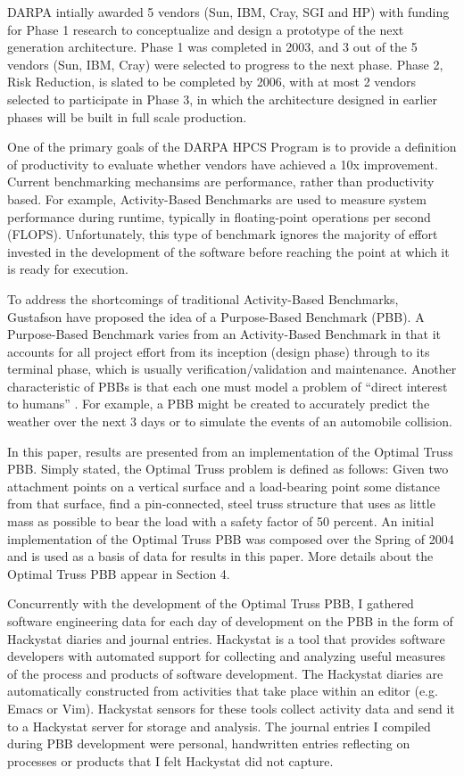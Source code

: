 \documentclass[11pt,twocolumn]{article}
\begin{document}
DARPA intially awarded 5 vendors (Sun, IBM, Cray, SGI and HP) with
funding for Phase 1 research to conceptualize and design a prototype
of the next generation architecture.  Phase 1 was completed in 2003,
and 3 out of the 5 vendors (Sun, IBM, Cray) were selected to progress to
the next phase.  Phase 2, Risk Reduction, is slated to be completed by
2006, with at most 2 vendors selected to participate in Phase 3, in
which the architecture designed in earlier phases will be built in
full scale production.

One of the primary goals of the DARPA HPCS Program is to provide a
definition of productivity to evaluate whether vendors have achieved a
10x improvement\cite{Faulk04}.  Current benchmarking mechansims are
performance, rather than productivity based.  For example,
Activity-Based Benchmarks are used to measure system performance
during runtime, typically in floating-point operations per second
(FLOPS).  Unfortunately, this type of benchmark ignores the majority
of effort invested in the development of the software before reaching
the point at which it is ready for execution.

To address the shortcomings of traditional Activity-Based Benchmarks,
Gustafson \cite{Gustafson04} have proposed the idea of a Purpose-Based
Benchmark (PBB).  A Purpose-Based Benchmark varies from an
Activity-Based Benchmark in that it accounts for all project effort
from its inception (design phase) through to its terminal phase,
which is usually verification/validation and maintenance.  Another
characteristic of PBBs is that each one must model a problem of ``direct
interest to humans'' \cite{Gustafson04}.  For example, a PBB might be
created to accurately predict the weather over the next 3 days or to
simulate the events of an automobile collision.

In this paper, results are presented from an implementation of the
Optimal Truss PBB.  Simply stated, the Optimal Truss problem is
defined as follows:  Given two attachment points on a vertical surface
and a load-bearing point some distance from that surface, find a
pin-connected, steel truss structure that uses as little mass as
possible to bear the load with a safety factor of 50 percent.  An initial
implementation of the Optimal Truss PBB was composed over the Spring of
2004 and is used as a basis of data for results in this paper.  More
details about the Optimal Truss PBB appear in Section 4.

Concurrently with the development of the Optimal Truss PBB, I gathered
software engineering data for each day of development on the PBB in
the form of Hackystat diaries and journal entries.  Hackystat is a
tool that provides software developers with automated support for
collecting and analyzing useful measures of the process and products
of software development.  The Hackystat diaries are automatically
constructed from activities that take place within an editor
(e.g. Emacs or Vim).  Hackystat sensors for these tools collect
activity data and send it to a Hackystat server for storage and
analysis.  The journal entries I compiled during PBB development were
personal, handwritten entries reflecting on processes or products that
I felt Hackystat did not capture.
\end{document}
